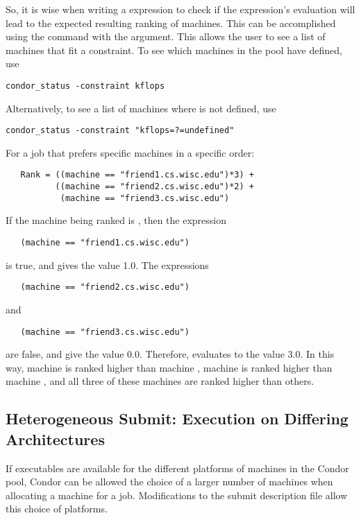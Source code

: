 So, it is wise when writing a  expression to check
if the expression's evaluation will lead to the expected
resulting ranking of machines.
This can be accomplished using the  command with the
 argument.  This allows the user to see a list of
machines that fit a constraint.
To see which machines in the pool have  defined,
use
\begin{verbatim}
condor_status -constraint kflops
\end{verbatim}
Alternatively, to see a list of machines where 
 is not defined, use
\begin{verbatim}
condor_status -constraint "kflops=?=undefined"
\end{verbatim}

For a job that prefers specific machines in a specific order:
\begin{verbatim}
   Rank = ((machine == "friend1.cs.wisc.edu")*3) +
          ((machine == "friend2.cs.wisc.edu")*2) +
           (machine == "friend3.cs.wisc.edu")
\end{verbatim}
If the machine being ranked is , then the
expression
\begin{verbatim}
   (machine == "friend1.cs.wisc.edu")
\end{verbatim}
is true, and gives the value 1.0.
The expressions
\begin{verbatim}
   (machine == "friend2.cs.wisc.edu")
\end{verbatim}
and
\begin{verbatim}
   (machine == "friend3.cs.wisc.edu")
\end{verbatim}
are false, and give the value 0.0.
Therefore,  evaluates to the value 3.0.
In this way, machine  is ranked higher than
machine ,
machine 
is ranked higher than 
machine ,
and all three of these machines are ranked higher than others.

\subsection{Heterogeneous Submit: Execution on Differing Architectures} 

If executables are available for the different platforms of machines
in the Condor pool,
Condor can be allowed the choice of a larger number of machines
when allocating a machine for a job.
Modifications to the submit description file allow this choice
of platforms.

